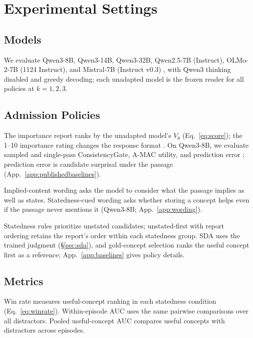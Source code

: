 \section{Experimental Settings}\label{sec:settings}\label{sec:setup}

\subsection{Models}

We evaluate Qwen3-8B, Qwen3-14B, Qwen3-32B, Qwen2.5-7B (Instruct), OLMo-2-7B (1124 Instruct), and Mistral-7B (Instruct v0.3) \citep{qwen3,qwen2025,olmo2,jiang2023mistral}, with Qwen3 thinking disabled and greedy decoding; each unadapted model is the frozen reader for all policies at $k=1,2,3$.

\subsection{Admission Policies}\label{sec:baselines}

The importance report ranks by the unadapted model's $V_\theta$ (Eq.~\eqref{eq:score}); the 1--10 importance rating changes the response format \citep{park2023generative}. On Qwen3-8B, we evaluate sampled and single-pass ConsistencyGate, A-MAC utility, and prediction error \citep{consistencygate2026,amac2026,nemori2026}; prediction error is candidate surprisal under the passage (App.~\ref{app:publishedbaselines}).

Implied-content wording asks the model to consider what the passage implies as well as states. Statedness-cued wording asks whether storing a concept helps even if the passage never mentions it (Qwen3-8B; App.~\ref{app:wording}).

Statedness rules prioritize unstated candidates; unstated-first with report ordering retains the report's order within each statedness group. SDA uses the trained judgment (\S\ref{sec:sda}), and gold-concept selection ranks the useful concept first as a reference; App.~\ref{app:baselines} gives policy details.

\subsection{Metrics}

Win rate measures useful-concept ranking in each statedness condition (Eq.~\eqref{eq:winrate}). Within-episode AUC uses the same pairwise comparisons over all distractors. Pooled useful-concept AUC compares useful concepts with distractors across episodes.


